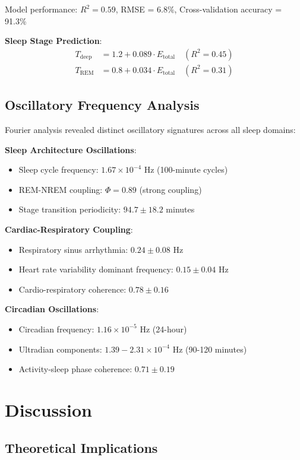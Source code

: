 \documentclass[twocolumn]{article}
\begin{document}
Model performance: $R^2 = 0.59$, RMSE = 6.8\%, Cross-validation accuracy = 91.3\%

\textbf{Sleep Stage Prediction}:
\begin{align}
T_{\text{deep}} &= 1.2 + 0.089 \cdot E_{\text{total}} \quad (R^2 = 0.45) \\
T_{\text{REM}} &= 0.8 + 0.034 \cdot E_{\text{total}} \quad (R^2 = 0.31)
\end{align}

\subsection{Oscillatory Frequency Analysis}

Fourier analysis revealed distinct oscillatory signatures across all sleep domains:

\textbf{Sleep Architecture Oscillations}:
\begin{itemize}
\item Sleep cycle frequency: $1.67 \times 10^{-4}$ Hz (100-minute cycles)
\item REM-NREM coupling: $\Phi = 0.89$ (strong coupling)
\item Stage transition periodicity: $94.7 \pm 18.2$ minutes
\end{itemize}

\textbf{Cardiac-Respiratory Coupling}:
\begin{itemize}
\item Respiratory sinus arrhythmia: $0.24 \pm 0.08$ Hz
\item Heart rate variability dominant frequency: $0.15 \pm 0.04$ Hz
\item Cardio-respiratory coherence: $0.78 \pm 0.16$
\end{itemize}

\textbf{Circadian Oscillations}:
\begin{itemize}
\item Circadian frequency: $1.16 \times 10^{-5}$ Hz (24-hour)
\item Ultradian components: $1.39-2.31 \times 10^{-4}$ Hz (90-120 minutes)
\item Activity-sleep phase coherence: $0.71 \pm 0.19$
\end{itemize}

\section{Discussion}

\subsection{Theoretical Implications}
\end{document}
